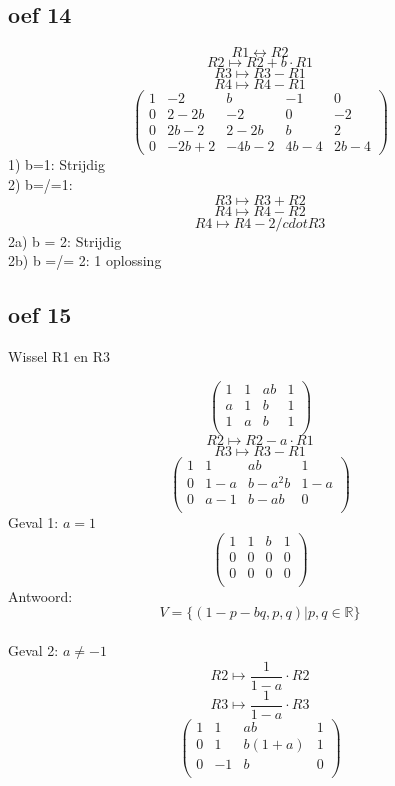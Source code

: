 \documentclass[lineaire_algebra_oplossingen.tex]{subfiles}
\begin{document}
\subsection{oef 14}
\[R1 \leftrightarrow R2 \]
\[R2 \longmapsto R2 + b\cdot R1\]
\[R3 \longmapsto R3 - R1\]
\[R4 \longmapsto R4 - R1\]
\[
\begin{pmatrix}
1 &  -2 &  b & -1 & 0\\
0 &  2-2b &  -2 & 0 & -2\\
0 & 2b-2 & 2-2b & b & 2\\
0 & -2b+2 & -4b-2 & 4b-4 & 2b-4
\end{pmatrix}
\]
1) b=1: Strijdig 
\[\]
2) b=/=1:
\[R3 \longmapsto R3 + R2\]
\[R4 \longmapsto R4 - R2\]
\[R4 \longmapsto R4 -2/cdot R3\]
2a) b = 2: Strijdig
\[\]
2b) b =/= 2: 1 oplossing

\subsection{oef 15}
\begin{center}
Wissel R1 en R3
\end{center}
\[
\begin{pmatrix}
1 & 1 & ab & 1\\
a & 1 & b & 1\\
1 & a & b & 1\\
\end{pmatrix}
\]
\[ R2 \longmapsto R2 - a\cdot R1 \]
\[ R3 \longmapsto R3 - R1 \]
\[
\begin{pmatrix}
1 & 1 & ab & 1\\
0 & 1-a & b-a^2b & 1-a\\
0 & a-1 & b-ab & 0\\
\end{pmatrix}
\]
Geval 1: $a=1$
\[
\begin{pmatrix}
1 & 1 & b & 1\\
0 & 0 & 0 & 0\\
0 & 0 & 0 & 0\\
\end{pmatrix}
\]
Antwoord:
\[
V = \{ (1-p-bq,p,q) | p,q \in \mathbb{R} \}
\]\\
Geval 2: $a \neq -1$
\[ R2 \longmapsto \frac{1}{1-a}\cdot R2 \]
\[ R3 \longmapsto \frac{1}{1-a}\cdot R3 \]
\[
\begin{pmatrix}
1 & 1 & ab & 1\\
0 & 1 & b(1+a) & 1\\
0 & -1 & b & 0\\
\end{pmatrix}
\]
\end{document}
